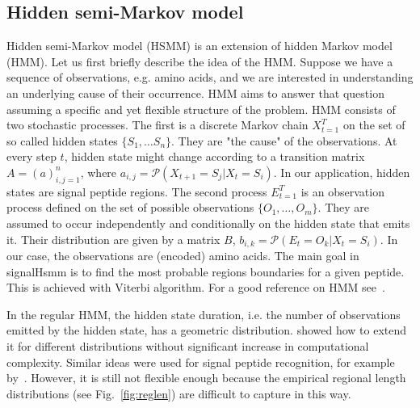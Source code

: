 \documentclass[10pt,letterpaper]{article}
\begin{document}
\subsection*{Hidden semi-Markov model}
Hidden semi-Markov model (HSMM) is an extension of hidden Markov model (HMM). 
Let us first briefly describe the idea of the HMM. 
Suppose we have a sequence of observations, e.g. amino acids, and we are interested in understanding an underlying cause of their occurrence. 
HMM aims to answer that question assuming a specific and yet flexible structure of the problem.
HMM consists of two stochastic processes. The first is a discrete Markov chain $X_{t=1}^T$ on the set of so called hidden states $\{S_1, \dots S_n\}$.
They are "the cause" of the observations. At every step $t$, hidden state might change according to a transition matrix
$A= (a)_{i,j=1}^n$, where $a_{i,j} = \mathcal{P}(X_{t+1} = S_j | X_t = S_i)$. In our application, hidden states are signal peptide regions.
The second process $E_{t=1}^T$ is an observation process defined on the set of possible observations $\{O_1, \dots, O_m\}$. They are assumed to occur independently and conditionally on the hidden state that emits it. 
Their distribution are given by a matrix $B$, $b_{i,k} = \mathcal{P}(E_t = O_k | X_t = S_i)$.
In our case, the observations are (encoded) amino acids.
The main goal in signalHsmm is to find the most probable regions boundaries for a given peptide. This is achieved with Viterbi algorithm.
For a good reference on HMM see~\cite{1989rabinera}.

In the regular HMM, the hidden state duration, i.e. the number of observations emitted by the hidden state, has a geometric distribution. \cite{Durbin98biologicalsequence} showed how to extend it for different distributions without significant increase in computational 
complexity. Similar ideas were used for signal peptide recognition, for example by~\cite{2004klla}. 
However, it is still not flexible enough because the empirical regional length distributions (see Fig.~\ref{fig:reglen})
are difficult to capture in this way.
\end{document}
